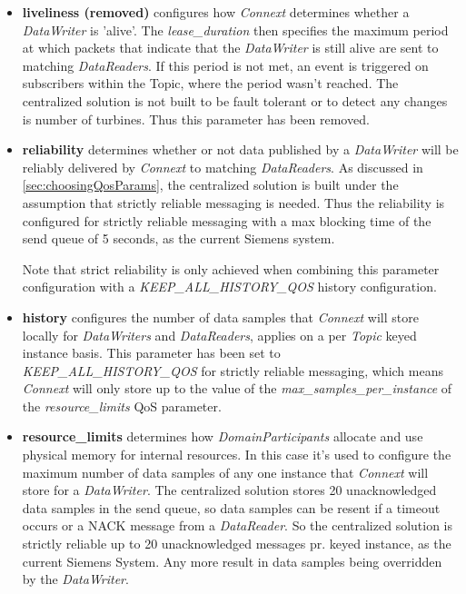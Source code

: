 \begin{itemize}
	\item \textbf{liveliness (removed)} configures how \textit{Connext} determines whether a \textit{DataWriter} is 'alive'. The \textit{lease\_duration} then specifies the maximum period at which packets that indicate that the \textit{DataWriter} is still alive are sent to matching \textit{DataReaders}. If this period is not met, an event is triggered on subscribers within the Topic, where the period wasn't reached. The centralized solution is not built to be fault tolerant or to detect any changes is number of turbines. Thus this parameter has been removed.
	\item \textbf{reliability} determines whether or not data published by a \textit{DataWriter} will be reliably delivered by \textit{Connext} to matching \textit{DataReaders}. As discussed in \cref{sec:choosingQosParams}, the centralized solution is built under the assumption that strictly reliable messaging is needed. Thus the reliability is configured for strictly reliable messaging with a max blocking time of the send queue of 5 seconds, as the current Siemens system.
	
	Note that strict reliability is only achieved when combining this parameter configuration with a \textit{KEEP\_ALL\_HISTORY\_QOS} history configuration.
	\item \textbf{history} configures the number of data samples that \textit{Connext} will store locally for \textit{DataWriters} and \textit{DataReaders}, applies on a per \textit{Topic} keyed instance basis. This parameter has been set to \textit{KEEP\_ALL\_HISTORY\_QOS} for strictly reliable messaging, which means \textit{Connext} will only store up to the value of the \textit{max\_samples\_per\-\_instance} of the \textit{resource\_limits} QoS parameter.
	\item \textbf{resource\_limits} determines how \textit{DomainParticipants} allocate and use physical memory for internal resources. In this case it's used to configure the maximum number of data samples of any one instance that \textit{Connext} will store for a \textit{DataWriter}. The centralized solution stores 20 unacknowledged data samples in the send queue, so data samples can be resent if a timeout occurs or a NACK message from a \textit{DataReader}. So the centralized solution is strictly reliable up to 20 unacknowledged messages pr. keyed instance, as the current Siemens System. Any more result in data samples being overridden by the \textit{DataWriter}.
	

\end{itemize}
